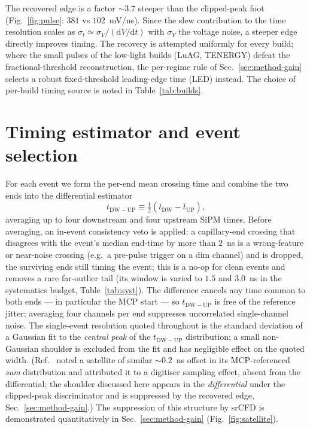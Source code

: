 \documentclass[final,5p,times,twocolumn]{elsarticle}
\begin{document}
The recovered edge is a factor $\sim\!3.7$ steeper than the clipped-peak foot
(Fig.~\ref{fig:pulse}: $381$ vs $102$~mV/ns). Since the slew contribution to the time
resolution scales as $\sigma_t \simeq \sigma_V/(\mathrm{d}V/\mathrm{d}t)$ with
$\sigma_V$ the voltage noise, a steeper edge directly improves timing. The recovery is
attempted uniformly for every build; where the small pulses of the low-light builds
(LuAG, TENERGY) defeat the fractional-threshold reconstruction, the per-regime rule of
Sec.~\ref{sec:method-gain} selects a robust fixed-threshold leading-edge time (LED)
instead. The choice of per-build timing source is noted in Table~\ref{tab:builds}.

\section{Timing estimator and event selection}
\label{sec:estimator}

For each event we form the per-end mean crossing time and combine the two ends into the
differential estimator
\begin{equation}
  t_{\mathrm{DW-UP}} \equiv \tfrac{1}{2}\!\left(\bar t_\mathrm{DW} - \bar t_\mathrm{UP}\right),
  \label{eq:dwup}
\end{equation}
averaging up to four downstream and four upstream SiPM times. Before averaging, an
in-event consistency veto is applied: a capillary-end crossing that disagrees with the
event's median end-time by more than $2$~ns is a wrong-feature or near-noise crossing
(e.g.\ a pre-pulse trigger on a dim channel) and is dropped, the surviving ends still
timing the event; this is a no-op for clean events and removes a rare far-outlier tail
(its window is varied to $1.5$ and $3.0$~ns in the systematics budget,
Table~\ref{tab:syst}). The difference cancels any
time common to both ends --- in particular the MCP start --- so $t_{\mathrm{DW-UP}}$ is
free of the reference jitter; averaging four channels per end suppresses uncorrelated
single-channel noise. The single-event resolution quoted throughout is the standard
deviation of a Gaussian fit to the \emph{central peak} of the $t_{\mathrm{DW-UP}}$
distribution; a small non-Gaussian shoulder is excluded from the fit and has negligible
effect on the quoted width. (Ref.~\cite{radical} noted a satellite of similar
$\sim\!0.2$~ns offset in its MCP-referenced \emph{sum} distribution and attributed it to
a digitiser sampling effect, absent from the differential; the shoulder discussed here
appears in the \emph{differential} under the clipped-peak discriminator and is
suppressed by the recovered edge, Sec.~\ref{sec:method-gain}.) The suppression of this structure by srCFD is demonstrated quantitatively in
Sec.~\ref{sec:method-gain} (Fig.~\ref{fig:satellite}).
\end{document}
